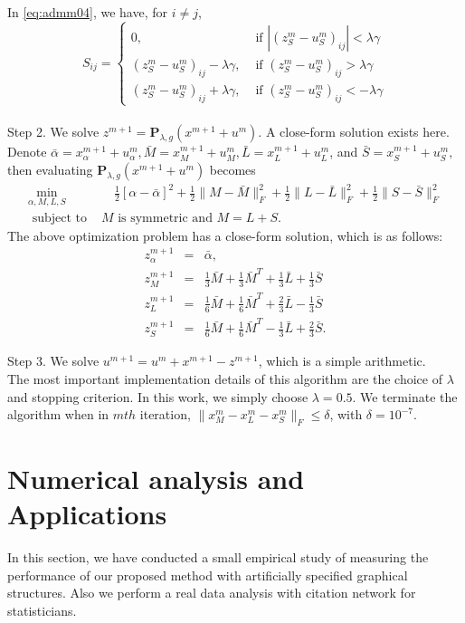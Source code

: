 \documentclass{article}
\begin{document}
In \eqref{eq:admm04}, we have, for $i \neq j$,
\[
S_{ij} = \left\{
\begin{array}{ll}
0, & \mbox{ if } |(z^m_S - u^m_S)_{ij}| < \lambda \gamma  \\
(z^m_S - u^m_S)_{ij}-\lambda\gamma , &
\mbox{ if } (z^m_S - u^m_S)_{ij} > \lambda \gamma \\
(z^m_S - u^m_S)_{ij}+\lambda\gamma , &
\mbox{ if } (z^m_S - u^m_S)_{ij} <- \lambda \gamma
\end{array}
\right.
\]
\\

\noindent
Step 2. We solve $z^{m+1} = \mathbf{P}_{\lambda,g}(x^{m+1} + u^m)$.
A close-form solution exists here.
Denote
$
\bar{\alpha} = x^{m+1}_\alpha + u^m_\alpha,
\bar{M} = x^{m+1}_M + u^m_M,
\bar{L} = x^{m+1}_L + u^m_L$, and
$\bar{S} = x^{m+1}_S + u^m_S,
$
then evaluating $\mathbf{P}_{\lambda,g}(x^{m+1} + u^m)$ becomes
\begin{eqnarray*}
\min_{\alpha,M,L,S} & \quad
\frac{1}{2}[\alpha - \bar{\alpha}]^2
+ \frac{1}{2}\|M - \bar{M}\|^2_F
+ \frac{1}{2}\|L - \bar{L}\|^2_F
+ \frac{1}{2}\|S - \bar{S}\|^2_F  \\
\mbox{ subject to } & M \mbox{ is symmetric and } M=L+S.
\end{eqnarray*}
The above optimization problem has a close-form solution, which is as follows:
\begin{eqnarray*}
z^{m+1}_\alpha &=& \bar{\alpha}, \\
z^{m+1}_M &=&
\frac{1}{3} \bar{M} + \frac{1}{3} \bar{M}^T + \frac{1}{3} \bar{L} + \frac{1}{3} \bar{S} \\
z^{m+1}_L &=&
\frac{1}{6} \bar{M} + \frac{1}{6} \bar{M}^T + \frac{2}{3} \bar{L} - \frac{1}{3} \bar{S} \\
z^{m+1}_S &=&
\frac{1}{6} \bar{M} + \frac{1}{6} \bar{M}^T - \frac{1}{3} \bar{L} + \frac{2}{3} \bar{S}.
\end{eqnarray*}

\noindent
Step 3. We solve $u^{m+1} = u^m + x^{m+1} - z^{m+1}$, which is a simple arithmetic. \\

The most important implementation details of this algorithm are the choice of $\lambda$ and stopping criterion. In this work, we simply choose $\lambda = 0.5$. We terminate the algorithm  when in $mth$ iteration, $\|x^{m}_M - x^{m}_L - x^{m}_S\|_F \leq \delta$, with $\delta=10^{-7}$.

\section{ Numerical analysis and Applications}
In this section, we have conducted a small empirical study of measuring the performance of our proposed method with artificially specified graphical structures. Also we perform a real data analysis with citation network for statisticians.
\end{document}
